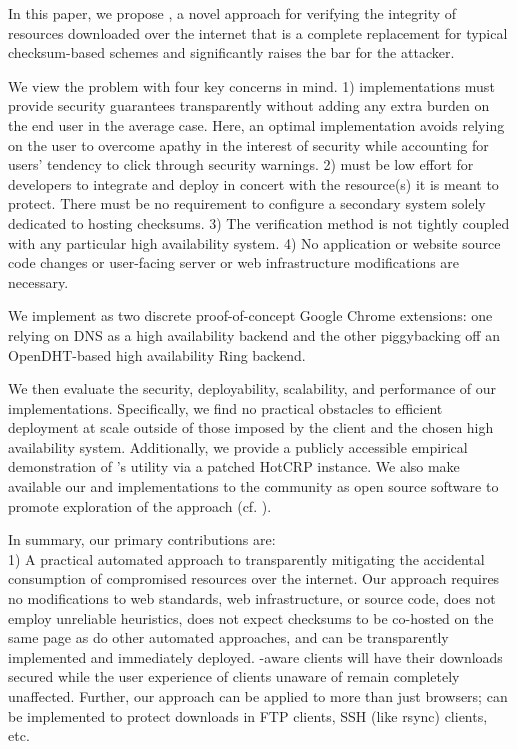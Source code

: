 In this paper, we propose \SYSTEM{}, a novel approach for verifying the
integrity of resources downloaded over the internet that is a complete
replacement for typical checksum-based schemes and significantly raises the bar
for the attacker.

We view the problem with four key concerns in mind. 1) \SYSTEM{} implementations
must provide security guarantees transparently without adding any extra burden
on the end user in the average case. Here, an optimal implementation avoids
relying on the user to overcome apathy in the interest of security while
accounting for users' tendency to click through security warnings. 2) \SYSTEM{}
must be low effort for developers to integrate and deploy in concert with the
resource(s) it is meant to protect. There must be no requirement to configure a
secondary system solely dedicated to hosting checksums. 3) The verification
method is not tightly coupled with any particular high availability system. 4)
No application or website source code changes or user-facing server or web
infrastructure modifications are necessary.

We implement \SYSTEM{} as two discrete proof-of-concept Google Chrome
extensions: one relying on DNS as a high availability backend and the other
piggybacking off an OpenDHT-based high availability Ring backend.

We then evaluate the security, deployability, scalability, and performance of
our implementations. Specifically, we find no practical obstacles to efficient
deployment at scale outside of those imposed by the client and the chosen high
availability system. Additionally, we provide a publicly accessible empirical
demonstration of \SYSTEM{}'s utility via a patched HotCRP instance. We also make
available our \DNSSYS{} and \DHTSYS{} implementations to the community as open
source software to promote exploration of the \SYSTEM{} approach (cf.
).

In summary, our primary contributions are: \\

1) A practical automated approach to transparently mitigating the accidental
consumption of compromised resources over the internet. Our approach requires no
modifications to web standards, web infrastructure, or source code, does not
employ unreliable heuristics, does not expect checksums to be co-hosted on the
same page as do other automated approaches, and can be transparently implemented
and immediately deployed. \SYSTEM{}-aware clients will have their downloads
secured while the user experience of clients unaware of \SYSTEM{} remain
completely unaffected. Further, our approach can be applied to more than just
browsers; \SYSTEM{} can be implemented to protect downloads in FTP clients, SSH
(like rsync) clients, etc. \\

